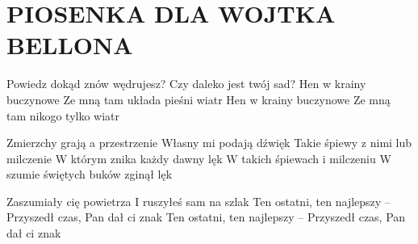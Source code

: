 \documentclass[../../../songbook.tex]{subfiles}
\begin{document}
\TabPositions{8cm} %
\section*{PIOSENKA DLA WOJTKA BELLONA}
{}
\vspace{0.5cm}

Powiedz dokąd znów wędrujesz? 	 \newline
Czy daleko jest twój sad? 		 \newline
Hen w krainy buczynowe 			 \newline
Ze mną tam układa pieśni wiatr 	 \newline
Hen w krainy buczynowe 			 \newline
Ze mną tam nikogo tylko wiatr	 \newline

Zmierzchy grają a przestrzenie		\newline
Własny mi podają dźwięk				\newline
Takie śpiewy z nimi lub milczenie	\newline
W którym znika każdy dawny lęk		\newline
W takich śpiewach i milczeniu		\newline
W szumie świętych buków zginął lęk	\newline

Zaszumiały cię powietrza			\newline
I ruszyłeś sam na szlak				\newline
Ten ostatni, ten najlepszy –		\newline
Przyszedł czas, Pan dał ci znak		\newline
Ten ostatni, ten najlepszy –		\newline
Przyszedł czas, Pan dał ci znak		\newline
\end{document}
